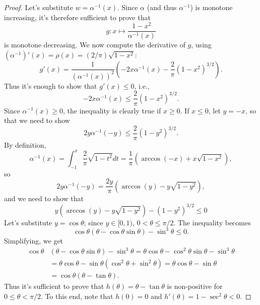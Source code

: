 \documentclass[10pt,a4paper]{amsart}
\begin{document}
\begin{proof}
Let's substitute $w=\alpha^{-1}(x)$.  Since $\alpha$ (and thus $\alpha^{-1}$) is monotone increasing, it's therefore sufficient to prove that 
$$g: x\mapsto \frac{1-x^2}{\alpha^{-1}(x)}$$ is monotone decreasing. We now compute the derivative of $g$, using $(\alpha^{-1})'(x)=\rho(x) = (2/\pi) \sqrt{1-x^2}$:
$$
g'(x) = \frac{1}{(\alpha^{-1}(x))^2 }\left(
-2x \alpha^{-1}(x) -  \frac{2}{\pi} (1-x^2)^{3/2}
\right).
$$
Thus it's enough to show that $g'(x)\leq 0$, i.e., $$
-2x\alpha^{-1}(x) \leq \frac{2}{\pi} (1-x^2)^{3/2}.$$ Since $\alpha^{-1}(x)\geq 0$, the inequality is clearly true if $x\geq  0$.  If $x\leq 0$, let $y=-x$, so that we need to show
$$
2y\alpha^{-1}(-y) \leq  \frac{2}{\pi} (1-y^2)^{3/2}.
$$
By definition, $$\alpha^{-1}(x)=\int_{-1}^{x} \frac{2}{\pi}\sqrt{1-t^2} dt = \frac{1}{\pi} \left(\arccos(-x) + x\sqrt{1-x^2}\right), $$ 
so $$2y\alpha^{-1}(-y) = \frac{2y}{\pi} \left( \arccos(y) - y\sqrt{1-y^2}\right),$$ and we need to show that
$${y} \left( \arccos(y) - y\sqrt{1-y^2}\right) 
 - (1-y^2)^{3/2}\leq 0
$$  Let's substitute $y=\cos\theta$; since $y\in [0,1)$, $0<\theta\leq \pi/2$.  The inequality becomes
$$
\cos\theta (\theta - \cos\theta \sin\theta ) - \sin^{3}\theta\leq 0.
$$
Simplifying, we get
\begin{align*}
\cos\theta &(\theta - \cos\theta \sin\theta ) - \sin^{3}\theta 
 = \theta \cos\theta -\cos^2\theta \sin\theta -\sin^3\theta \\
& = \theta \cos\theta -\sin\theta(\cos^2\theta +\sin^2\theta) 
= \theta\cos\theta -\sin\theta \\ & = \cos\theta (\theta -\tan\theta).
\end{align*}
Thus it's sufficient to prove that $h(\theta) = \theta - \tan\theta$ is non-positive for $0\leq \theta <\pi/2$. To this end, note that $h(0)=0$ and $h'(\theta)=1-\sec^2\theta<0$.
\end{proof}
\end{document}
